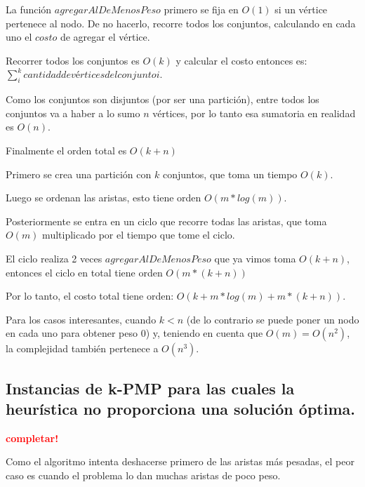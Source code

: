 \vspace*{0.3cm}

La función $agregarAlDeMenosPeso$ primero se fija en $O(1)$ si un vértice
pertenece al nodo. De no hacerlo, recorre todos los conjuntos, calculando en
cada uno el $costo$ de agregar el vértice.

Recorrer todos los conjuntos es $O(k)$ y calcular el costo entonces es:
$\sum_{i}^{k} cantidad de vértices del conjunto i$.

Como los conjuntos son disjuntos (por ser una partición), entre todos los
conjuntos va a haber a lo sumo $n$ vértices, por lo tanto esa sumatoria en
realidad es $O(n)$.

Finalmente el orden total es $O(k + n)$

\vspace*{0.3cm}


Primero se crea una partición con $k$ conjuntos, que toma un tiempo $O(k)$.

Luego se ordenan las aristas, esto tiene orden $O(m * log(m))$.

Posteriormente se entra en un ciclo que recorre todas las aristas, que toma
$O(m)$ multiplicado por el tiempo que tome el ciclo.

El ciclo realiza 2 veces $agregarAlDeMenosPeso$ que ya vimos toma $O(k + n)$,
entonces el ciclo en total tiene orden $O(m * (k + n))$

Por lo tanto, el costo total tiene orden: $O(k + m * log(m) + m * (k + n))$.

Para los casos interesantes, cuando $k < n$ (de lo contrario se puede poner un
nodo en cada uno para obtener peso 0) y, teniendo en cuenta que $O(m) = O(n^2)$,
la complejidad también pertenece a $O(n^3)$.

\newpage
\subsection{Instancias de k-PMP para las cuales la heurística no proporciona
            una solución óptima.}
\vspace*{0.3cm}
\textcolor{red}{\textbf{completar!}}

Como el algoritmo intenta deshacerse primero de las aristas más pesadas, el
peor caso es cuando el problema lo dan muchas aristas de poco peso.

